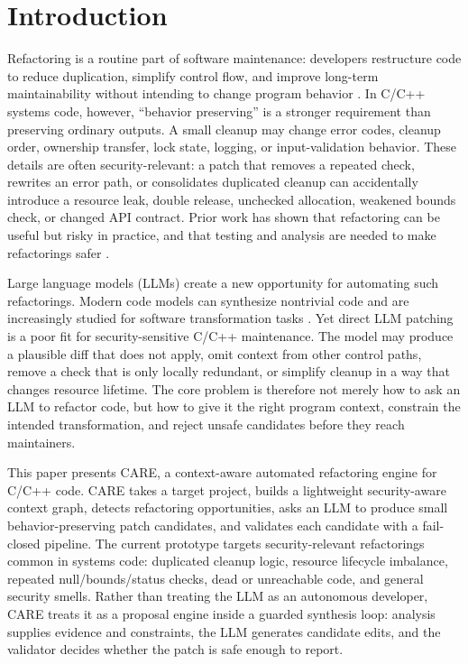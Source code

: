 \providecommand{\SysName}{CARE}

\section{Introduction}
\label{sec:introduction}

Refactoring is a routine part of software maintenance: developers restructure
code to reduce duplication, simplify control flow, and improve long-term
maintainability without intending to change program behavior
\cite{fowler2018refactoring,mens2004survey}. In C/C++ systems code, however,
``behavior preserving'' is a stronger requirement than preserving ordinary
outputs. A small cleanup may change error codes, cleanup order, ownership
transfer, lock state, logging, or input-validation behavior. These details are
often security-relevant: a patch that removes a repeated check, rewrites an
error path, or consolidates duplicated cleanup can accidentally introduce a
resource leak, double release, unchecked allocation, weakened bounds check, or
changed API contract. Prior work has shown that refactoring can be useful but
risky in practice, and that testing and analysis are needed to make
refactorings safer \cite{soares2010making,kim2014empirical,vassallo2019large}.

Large language models (LLMs) create a new opportunity for automating such
refactorings. Modern code models can synthesize nontrivial code and are
increasingly studied for software transformation tasks
\cite{chen2021evaluating,li2022competition,liu2024empirical}. Yet direct LLM
patching is a poor fit for security-sensitive C/C++ maintenance. The model may
produce a plausible diff that does not apply, omit context from other control
paths, remove a check that is only locally redundant, or simplify cleanup in a
way that changes resource lifetime. The core problem is therefore not merely
how to ask an LLM to refactor code, but how to give it the right program
context, constrain the intended transformation, and reject unsafe candidates
before they reach maintainers.

This paper presents \SysName{}, a context-aware automated refactoring engine for
C/C++ code. \SysName{} takes a target project, builds a lightweight
security-aware context graph, detects refactoring opportunities, asks an LLM to
produce small behavior-preserving patch candidates, and validates each
candidate with a fail-closed pipeline. The current prototype targets
security-relevant refactorings common in systems code: duplicated cleanup
logic, resource lifecycle imbalance, repeated null/bounds/status checks, dead
or unreachable code, and general security smells. Rather than treating the LLM
as an autonomous developer, \SysName{} treats it as a proposal engine inside a
guarded synthesis loop: analysis supplies evidence and constraints, the LLM
generates candidate edits, and the validator decides whether the patch is safe
enough to report.


